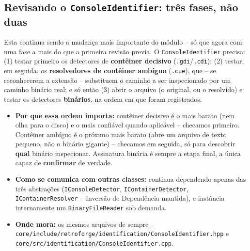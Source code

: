 \subsection{Revisando o \texttt{ConsoleIdentifier}: três fases, não duas}

Esta continua sendo a mudança mais importante do módulo -- só que agora com uma fase a mais do que a primeira revisão previa. O \texttt{ConsoleIdentifier} precisa: (1) testar primeiro os detectores de \textbf{contêiner decisivo} (\texttt{.gdi}/\texttt{.cdi}); (2) testar, em seguida, os \textbf{resolvedores de contêiner ambíguo} (\texttt{.cue}), que -- se reconhecerem a extensão -- substituem o caminho a ser inspecionado por um caminho binário real; e só então (3) abrir o arquivo (o original, ou o resolvido) e testar os detectores \textbf{binários}, na ordem em que foram registrados.

\begin{itemize}
    \item \textbf{Por que essa ordem importa:} contêiner decisivo é o mais barato (nem olha para o disco) e o mais confiável quando aplicável -- checamos primeiro. Contêiner ambíguo é o próximo mais barato (abre um arquivo de texto pequeno, não o binário gigante) -- checamos em seguida, só para descobrir \textbf{qual} binário inspecionar. Assinatura binária é sempre a etapa final, a única capaz de \textbf{confirmar} de verdade.
    \item \textbf{Como se comunica com outras classes:} continua dependendo apenas das três abstrações (\texttt{IConsoleDetector}, \texttt{IContainerDetector}, \texttt{IContainerResolver} -- Inversão de Dependência mantida), e instância internamente um \texttt{BinaryFileReader} sob demanda.
    \item \textbf{Onde mora:} os mesmos arquivos de sempre -- \texttt{core/include/retroforge/identification/ConsoleIdentifier.hpp} e \texttt{core/src/identification/ConsoleIdentifier.cpp}.
\end{itemize}

